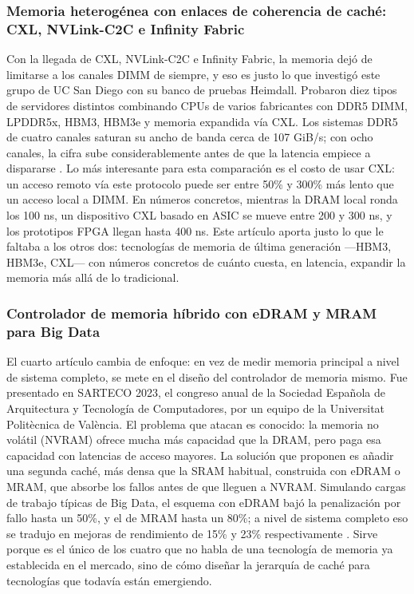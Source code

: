 \subsubsection{Memoria heterogénea con enlaces de coherencia de caché: CXL, NVLink-C2C e Infinity Fabric}

Con la llegada de CXL, NVLink-C2C e Infinity Fabric, la memoria dejó de limitarse a los canales
DIMM de siempre, y eso es justo lo que investigó este grupo de UC San Diego con su banco de
pruebas Heimdall. Probaron diez tipos de servidores distintos combinando CPUs de varios
fabricantes con DDR5 DIMM, LPDDR5x, HBM3, HBM3e y memoria expandida vía CXL. Los
sistemas DDR5 de cuatro canales saturan su ancho de banda cerca de 107 GiB/s; con ocho canales,
la cifra sube considerablemente antes de que la latencia empiece a dispararse
\cite{wang2024hitchhiker}. Lo más interesante para esta comparación es el costo de usar CXL: un acceso remoto vía este
protocolo puede ser entre 50\% y 300\% más lento que un acceso local a DIMM. En números
concretos, mientras la DRAM local ronda los 100 ns, un dispositivo CXL basado en ASIC se
mueve entre 200 y 300 ns, y los prototipos FPGA llegan hasta 400 ns. Este artículo aporta justo lo
que le faltaba a los otros dos: tecnologías de memoria de última generación ---HBM3, HBM3e,
CXL--- con números concretos de cuánto cuesta, en latencia, expandir la memoria más allá de lo
tradicional.

\subsubsection{Controlador de memoria híbrido con eDRAM y MRAM para Big Data}

El cuarto artículo cambia de enfoque: en vez de medir memoria principal a nivel de sistema
completo, se mete en el diseño del controlador de memoria mismo. Fue presentado en SARTECO
2023, el congreso anual de la Sociedad Española de Arquitectura y Tecnología de Computadores,
por un equipo de la Universitat Politècnica de València. El problema que atacan es conocido: la
memoria no volátil (NVRAM) ofrece mucha más capacidad que la DRAM, pero paga esa
capacidad con latencias de acceso mayores. La solución que proponen es añadir una segunda
caché, más densa que la SRAM habitual, construida con eDRAM o MRAM, que absorbe los fallos
antes de que lleguen a NVRAM. Simulando cargas de trabajo típicas de Big Data, el esquema con
eDRAM bajó la penalización por fallo hasta un 50\%, y el de MRAM hasta un 80\%; a nivel de
sistema completo eso se tradujo en mejoras de rendimiento de 15\% y 23\% respectivamente
\cite{lurbe2023controlador}. Sirve porque es el único de los cuatro que no habla de una tecnología de memoria ya
establecida en el mercado, sino de cómo diseñar la jerarquía de caché para tecnologías que todavía
están emergiendo.


